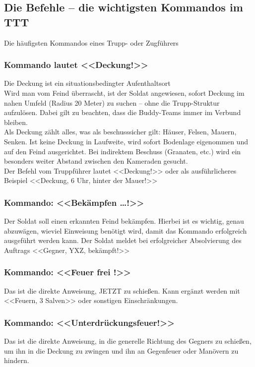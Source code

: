 \newpage
\subsection{Die Befehle – die wichtigsten Kommandos im TTT}
Die häufigsten Kommandos eines Trupp- oder Zugführers \\
\subsubsection{Kommando lautet <<Deckung!>>}
 Die Deckung ist ein situationsbedingter Aufenthaltsort \\ 
Wird man vom Feind überrascht, ist der Soldat angewiesen, sofort Deckung im nahen Umfeld (Radius 20 Meter) zu suchen – ohne die Trupp-Struktur aufzulösen. Dabei gilt zu beachten, dass die Buddy-Teams immer im Verbund bleiben. \\
Als Deckung zählt alles, was als beschusssicher gilt: Häuser, Felsen, Mauern, Senken. Ist keine Deckung in Laufweite, wird sofort Bodenlage eigenommen und auf den Feind ausgerichtet. Bei indirektem Beschuss (Granaten, etc.) wird ein besonders weiter Abstand zwischen den Kameraden gesucht.\\
Der Befehl vom Truppführer lautet <<Deckung!>> oder als ausführlicheres Beispiel <<Deckung, 6 Uhr, hinter der Mauer!>> \\
\subsubsection{Kommando: <<Bekämpfen …!>>}
Der Soldat soll einen erkannten Feind bekämpfen. Hierbei ist es wichtig, genau abzuwägen, wieviel Einweisung benötigt wird, damit das Kommando erfolgreich ausgeführt werden kann. Der Soldat meldet bei erfolgreicher Absolvierung des Auftrags <<Gegner, YXZ, bekämpft!>> \\
\subsubsection{Kommando: <<Feuer frei !>>}
Das ist die direkte Anweisung, JETZT zu schießen. Kann ergänzt werden mit <<Feuern, 3 Salven>> oder sonstigen Einschränkungen. \\
\subsubsection{Kommando: <<Unterdrückungsfeuer!>>}
Das ist die direkte Anweisung, in die generelle Richtung des Gegners zu schießen, um ihn in die Deckung zu zwingen und ihn an Gegenfeuer oder Manövern zu hindern. \\


